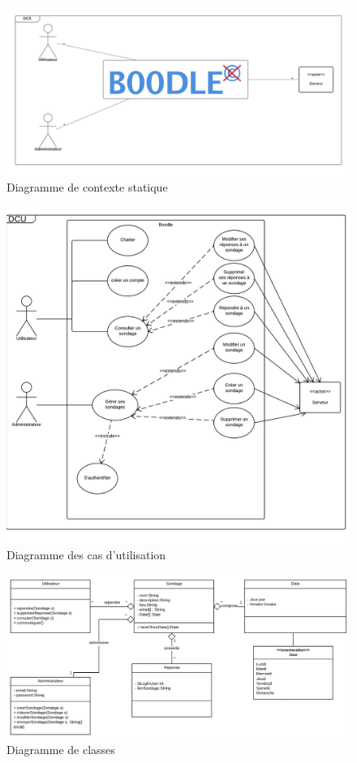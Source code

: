 \documentclass[titlepage]{report}
\begin{document}
\begin{figure}[h]
	\caption{Diagramme de contexte statique}
	\label{annexe_diagramme_contexteStatique}
	\centering
	\includegraphics[width=\textwidth]{figures/diagrammes/contexteStatique.png}
\end{figure}

\begin{figure}[h]
	\caption{Diagramme des cas d'utilisation}
	\label{annexe_diagramme_casDUtilisation}
	\centering
	\includegraphics[width=\textwidth]{figures/diagrammes/casDUtilisation.png}
\end{figure}

\begin{figure}[h]
	\caption{Diagramme de classes}
	\label{annexe_diagramme_classes}
	\centering
	\includegraphics[width=\textwidth]{figures/diagrammes/classes.png}
\end{figure}
\end{document}
